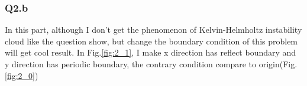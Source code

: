 \documentclass{article}
\begin{document}
\subsubsection*{Q2.b}
In this part, although I don't get the phenomenon of Kelvin-Helmholtz instability cloud like the question show, but change the boundary condition of this problem will get cool result.
In Fig.\ref{fig:2_1}, I make x direction has reflect boundary and y direction has periodic boundary, the contrary condition compare to origin(Fig.\ref{fig:2_0})
\begin{figure}[h]
    \centering
\end{figure}
\end{document}
